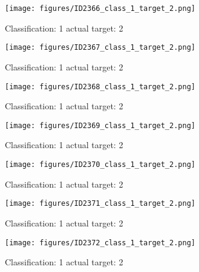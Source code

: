 \begin{figure}[h!]
\begin{center}
\texttt{[image: figures/ID2366\_class\_1\_target\_2.png]}
\end{center}
\caption{ Classification: 1 actual target: 2}
\label{fig:ID2366_class_1_target_2}
\end{figure}
\begin{figure}[h!]
\begin{center}
\texttt{[image: figures/ID2367\_class\_1\_target\_2.png]}
\end{center}
\caption{ Classification: 1 actual target: 2}
\label{fig:ID2367_class_1_target_2}
\end{figure}
\begin{figure}[h!]
\begin{center}
\texttt{[image: figures/ID2368\_class\_1\_target\_2.png]}
\end{center}
\caption{ Classification: 1 actual target: 2}
\label{fig:ID2368_class_1_target_2}
\end{figure}
\begin{figure}[h!]
\begin{center}
\texttt{[image: figures/ID2369\_class\_1\_target\_2.png]}
\end{center}
\caption{ Classification: 1 actual target: 2}
\label{fig:ID2369_class_1_target_2}
\end{figure}
\begin{figure}[h!]
\begin{center}
\texttt{[image: figures/ID2370\_class\_1\_target\_2.png]}
\end{center}
\caption{ Classification: 1 actual target: 2}
\label{fig:ID2370_class_1_target_2}
\end{figure}
\begin{figure}[h!]
\begin{center}
\texttt{[image: figures/ID2371\_class\_1\_target\_2.png]}
\end{center}
\caption{ Classification: 1 actual target: 2}
\label{fig:ID2371_class_1_target_2}
\end{figure}
\begin{figure}[h!]
\begin{center}
\texttt{[image: figures/ID2372\_class\_1\_target\_2.png]}
\end{center}
\caption{ Classification: 1 actual target: 2}
\label{fig:ID2372_class_1_target_2}
\end{figure}
